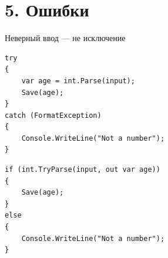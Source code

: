 \documentclass[aspectratio=169,10pt,t]{beamer}
\begin{document}
\begin{frame}[plain]
\end{frame}

\section{5. Ошибки}

\begin{frame}[plain]
\end{frame}

\begin{frame}[fragile]{Неверный ввод --- не исключение}
  \slidetop
  \begin{minipage}[t]{0.47\textwidth}
    \par\vspace{0.5em}
\begin{lstlisting}[style=csharp,basicstyle=\ttfamily\scriptsize]
try
{
    var age = int.Parse(input);
    Save(age);
}
catch (FormatException)
{
    Console.WriteLine("Not a number");
}
\end{lstlisting}
  \end{minipage}\hfill
  \begin{minipage}[t]{0.47\textwidth}
    \par\vspace{0.5em}
\begin{lstlisting}[style=csharp,basicstyle=\ttfamily\scriptsize]
if (int.TryParse(input, out var age))
{
    Save(age);
}
else
{
    Console.WriteLine("Not a number");
}
\end{lstlisting}
  \end{minipage}

  \slidegap
\end{frame}
\end{document}
